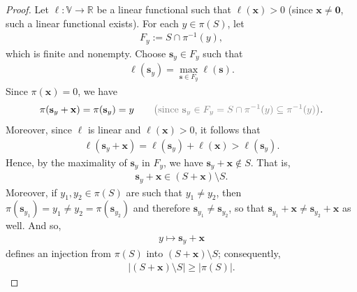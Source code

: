 \documentclass[10pt,a4paper]{amsart}
\newcommand{\VV}{\mathbb{V}} %
\newcommand{\abs}[1]{\left| #1 \right|}
\begin{document}
\begin{proof}
Let $\ell : \VV \to \mathbb{R}$ be a linear functional such that $\ell(\mathbf{x}) > 0$ (since $\mathbf{x} \neq \mathbf{0}$, such a linear functional exists). For each $y \in \pi(S)$, let \begin{align*}
    F_y := S \cap \pi^{-1}(y),
\end{align*} which is finite and nonempty. Choose $\mathbf{s}_y \in F_y$ such that \begin{align*}
    \ell(\mathbf{s}_y) = \max_{\mathbf{s} \in F_y}\ell(\mathbf{s}).
\end{align*} Since $\pi(\mathbf{x}) = 0$, we have \begin{align*}
    \pi(\mathbf{s}_y + \mathbf{x}) = \pi(\mathbf{s}_y) = y
    \qquad \textcolor{gray}{\left(\text{since } \mathbf{s}_y \in F_y = S \cap \pi^{-1}(y) \subseteq \pi^{-1}(y)\right)}.
\end{align*} Moreover, since $\ell$ is linear and $\ell(\mathbf{x}) > 0$, it follows that \begin{align*}
    \ell(\mathbf{s}_y + \mathbf{x}) = \ell(\mathbf{s}_y) + \ell(\mathbf{x}) > \ell(\mathbf{s}_y).
\end{align*} Hence, by the maximality of $\mathbf{s}_y$ in $F_y$, we have $\mathbf{s}_y + \mathbf{x} \notin S$. That is, \begin{align*}
    \mathbf{s}_y + \mathbf{x} \in (S+\mathbf{x}) \setminus S.
\end{align*} Moreover, if $y_1,y_2 \in \pi(S)$ are such that $y_1 \neq y_2$, then $\pi(\mathbf{s}_{y_1}) = y_1 \neq y_2 = \pi(\mathbf{s}_{y_2})$ and therefore $\mathbf{s}_{y_1} \neq \mathbf{s}_{y_2}$, so that $\mathbf{s}_{y_1} + \mathbf{x} \neq \mathbf{s}_{y_2} + \mathbf{x}$ as well.
And so, \begin{align*}
    y \mapsto \mathbf{s}_y + \mathbf{x}
\end{align*} defines an injection from $\pi(S)$ into $(S+\mathbf{x}) \setminus S$; consequently, \begin{align}\label{injection}
    \abs{(S+\mathbf{x}) \setminus S} \geq \abs{\pi(S)}.
\end{align} 


\end{proof}
\end{document}
